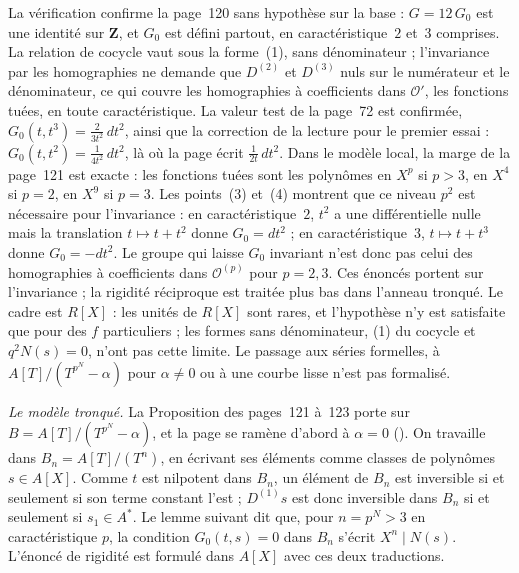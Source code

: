 \begin{remarque}
La vérification confirme la page~120 sans hypothèse sur la base : $G = 12\,G_0$ est une identité sur $\mathbf Z$, et $G_0$ est défini partout, en caractéristique~$2$ et~$3$ comprises. La relation de cocycle vaut sous la forme~(1), sans dénominateur ; l'invariance par les homographies ne demande que $D^{(2)}$ et $D^{(3)}$ nuls sur le numérateur et le dénominateur, ce qui couvre les homographies à coefficients dans $\mathcal O'$, les fonctions tuées, en toute caractéristique. La valeur test de la page~72 est confirmée, $G_0(t, t^3) = \frac{2}{3t^2}\,dt^2$, ainsi que la correction de la lecture pour le premier essai : $G_0(t, t^2) = \frac{1}{4t^2}\,dt^2$, là où la page écrit $\frac{1}{2t}\,dt^2$. Dans le modèle local, la marge de la page~121 est exacte : les fonctions tuées sont les polynômes en $X^p$ si $p > 3$, en $X^4$ si $p = 2$, en $X^9$ si $p = 3$. Les points~(3) et~(4) montrent que ce niveau $p^2$ est nécessaire pour l'invariance : en caractéristique~$2$, $t^2$ a une différentielle nulle mais la translation $t \mapsto t + t^2$ donne $G_0 = dt^2$ ; en caractéristique~$3$, $t \mapsto t + t^3$ donne $G_0 = -dt^2$. Le groupe qui laisse $G_0$ invariant n'est donc pas celui des homographies à coefficients dans $\mathcal O^{(p)}$ pour $p = 2, 3$. Ces énoncés portent sur l'invariance ; la rigidité réciproque est traitée plus bas dans l'anneau tronqué. Le cadre est $R[X]$ : les unités de $R[X]$ sont rares, et l'hypothèse  n'y est satisfaite que pour des $f$ particuliers ; les formes sans dénominateur, (1) du cocycle et $q^2 N(s) = 0$, n'ont pas cette limite. Le passage aux séries formelles, à $A[T]/(T^{p^N} - \alpha)$ pour $\alpha \neq 0$ ou à une courbe lisse n'est pas formalisé.
\end{remarque}

\noindent\emph{Le modèle tronqué.} La Proposition des pages~121 à~123 porte sur $B = A[T]/(T^{p^N} - \alpha)$, et la page se ramène d'abord à $\alpha = 0$ (). On travaille dans $B_n = A[T]/(T^n)$, en écrivant ses éléments comme classes de polynômes $s \in A[X]$. Comme $t$ est nilpotent dans $B_n$, un élément de $B_n$ est inversible si et seulement si son terme constant l'est ; $D^{(1)} s$ est donc inversible dans $B_n$ si et seulement si $s_1 \in A^*$. Le lemme suivant dit que, pour $n = p^N > 3$ en caractéristique $p$, la condition $G_0(t, s) = 0$ dans $B_n$ s'écrit $X^n \mid N(s)$. L'énoncé de rigidité est formulé dans $A[X]$ avec ces deux traductions.

